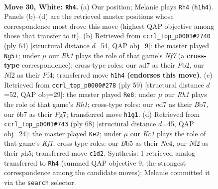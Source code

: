 \documentclass[11pt]{article}
\begin{document}
\clearpage

\begin{figure}[p]\centering
\begin{subfigure}{0.46\textwidth}\centering
\resizebox{\linewidth}{!}{%
\newchessgame
\chessboard[
  setfen={rn6/1b1n2k1/8/1B1p4/p7/P5P1/1PP2N2/2K4R w - - 3 30},
  showmover=false,
  pgfstyle=straightmove, color=movearrow, markmove={h1-h4}
]}
\caption{}
\end{subfigure}\hfill
\begin{subfigure}{0.46\textwidth}\centering
\resizebox{\linewidth}{!}{%
\newchessgame
\chessboard[
  setfen={3R4/p4Nbk/5np1/1rp4p/5P2/5BP1/1P5P/6K1 w - - 1 33},
  showmover=false,
  pgfstyle=straightmove, color=movearrow, markmove={f7-g5}
]}
\caption{}
\end{subfigure}
\\[4pt]
\begin{subfigure}{0.46\textwidth}\centering
\resizebox{\linewidth}{!}{%
\newchessgame
\chessboard[
  setfen={1k5r/1b4pp/p4p2/PnN5/1B6/4P3/4K1PP/2R5 b - - 3 30},
  showmover=false,
  pgfstyle=straightmove, color=movearrow, markmove={h8-e8}
]}
\caption{}
\end{subfigure}\hfill
\begin{subfigure}{0.46\textwidth}\centering
\resizebox{\linewidth}{!}{%
\newchessgame
\chessboard[
  setfen={1r4k1/6b1/p5p1/4p2p/1nN1P3/7P/3B2P1/R4K2 w - - 0 35},
  showmover=false,
  pgfstyle=straightmove, color=movearrow, markmove={f1-e2}
]}
\caption{}
\end{subfigure}
\caption{\textbf{Move 30, White: \texttt{Rh4}.} (a) Our position; Melanie plays \texttt{Rh4} (\texttt{h1h4}). Panels (b)--(d) are the retrieved master positions whose correspondence most drove this move (highest QAP objective among those that transfer to it). (b) Retrieved from \texttt{ccrl\_top\_p0001\#2740} (ply 64) [structural distance $d$=54, QAP obj=9]: the master played \texttt{Ng5+}; under $\mu$ our \emph{Rh1} plays the role of that game's \emph{Nf7} (a \textbf{cross-type} correspondence); cross-type roles: our \emph{n}d7 as their \emph{P}b2, our \emph{N}f2 as their \emph{P}f4; transferred move \texttt{h1h4} \textbf{(endorses this move)}. (c) Retrieved from \texttt{ccrl\_top\_p0000\#278} (ply 59) [structural distance $d$=52, QAP obj=29]: the master played \texttt{Re8}; under $\mu$ our \emph{Rh1} plays the role of that game's \emph{Rh1}; cross-type roles: our \emph{n}d7 as their \emph{B}b7, our \emph{b}b7 as their \emph{P}g7; transferred move \texttt{h1g1}. (d) Retrieved from \texttt{ccrl\_top\_p0001\#743} (ply 68) [structural distance $d$=45, QAP obj=24]: the master played \texttt{Ke2}; under $\mu$ our \emph{Kc1} plays the role of that game's \emph{Kf1}; cross-type roles: our \emph{B}b5 as their \emph{N}c4, our \emph{N}f2 as their \emph{p}h5; transferred move \texttt{c1d2}. Synthesis: 1 retrieved analog transferred to \texttt{Rh4} (summed QAP objective 9, the strongest correspondence among the candidate moves); Melanie committed it via the \texttt{search} selector.}
\label{fig:thought-m58}
\end{figure}
\end{document}
